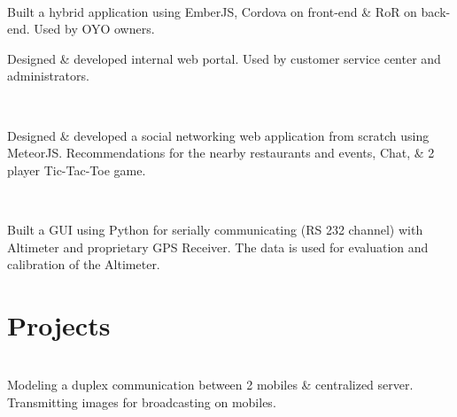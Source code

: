 \documentclass[]{deedy-resume-openfont}
\begin{document}
\hfill
{}\\
\begin{tightemize}
\item {}Built a hybrid application using EmberJS, Cordova on front-end \& RoR on back-end. Used by OYO owners.
\item {}Designed \& developed internal web portal. Used by customer service center and administrators.
\end{tightemize}

\hfill
{}\\
\begin{tightemize}
\item Designed \& developed a social networking web application from scratch using MeteorJS. Recommendations for the nearby restaurants and events, Chat, \& 2 player Tic-Tac-Toe game.
\end{tightemize}

\hfill
{}\\
\begin{tightemize}
\item Built a GUI using Python for serially communicating (RS 232 channel) with Altimeter and proprietary GPS Receiver. The data is used for evaluation and calibration of the Altimeter.
\end{tightemize}


\section{Projects}
\hfill
{}\\
Modeling a duplex communication between 2 mobiles \& centralized server. Transmitting images for broadcasting on mobiles.
\end{document}
